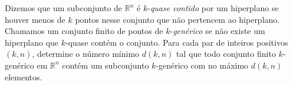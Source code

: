 Dizemos que um subconjunto de \(\mathbb{R}^n\) é \(k\)-\textit{quase contido} por um hiperplano se houver menos de \(k\) pontos nesse conjunto que não pertencem ao hiperplano. Chamamos um conjunto finito de pontos de \(k\)-\textit{genérico} se não existe um hiperplano que \(k\)-quase contém o conjunto. Para cada par de inteiros positivos \((k, n)\), determine o número mínimo \(d(k, n)\) tal que todo conjunto finito \(k\)-genérico em \(\mathbb{R}^n\) contém um subconjunto \(k\)-genérico com no máximo \(d(k, n)\) elementos.
